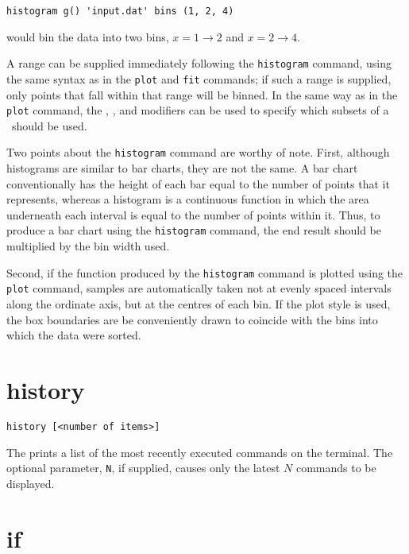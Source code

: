 \begin{verbatim}
histogram g() 'input.dat' bins (1, 2, 4)
\end{verbatim}

\noindent would bin the data into two bins, $x=1\to 2$ and $x=2\to 4$.

A range can be supplied immediately following the {\tt histogram} command,
using the same syntax as in the {\tt plot} and {\tt fit} commands; if such a
range is supplied, only points that fall within that range will be binned.  In
the same way as in the {\tt plot} command, the ,
,  and  modifiers can be used to
specify which subsets of a \datafile\ should be used.

Two points about the {\tt histogram} command are worthy of note. First,
although histograms are similar to bar charts, they are not the same.  A bar
chart conventionally has the height of each bar equal to the number of points
that it represents, whereas a histogram is a continuous function in which the
area underneath each interval is equal to the number of points within it.
Thus, to produce a bar chart using the {\tt histogram} command, the end result
should be multiplied by the bin width used.

Second, if the function produced by the {\tt histogram} command is plotted
using the {\tt plot} command, samples are automatically taken not at evenly
spaced intervals along the ordinate axis, but at the centres of each bin. If
the  plot style is used, the box boundaries are be conveniently
drawn to coincide with the bins into which the data were sorted.


\section{history}

\begin{verbatim}
history [<number of items>]
\end{verbatim}

The  prints a list of the most recently executed commands on
the terminal.  The optional parameter, {\tt N}, if supplied, causes only the
latest $N$ commands to be displayed.


\section{if}

